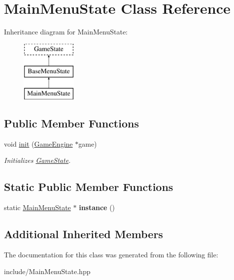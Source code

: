 \hypertarget{class_main_menu_state}{}\section{Main\+Menu\+State Class Reference}
\label{class_main_menu_state}
Inheritance diagram for Main\+Menu\+State\+:\begin{figure}[H]
\begin{center}
\leavevmode
\includegraphics[height=3.000000cm]{class_main_menu_state}
\end{center}
\end{figure}
\subsection*{Public Member Functions}
\begin{DoxyCompactItemize}
\item 
\mbox{\label{class_main_menu_state_a83efff7f63145d55d1937e76970d2a25}} 
void \mbox{\hyperlink{class_main_menu_state_a83efff7f63145d55d1937e76970d2a25}{init}} (\mbox{\hyperlink{class_game_engine}{Game\+Engine}} $\ast$game)
\begin{DoxyCompactList}\small\item\em Initializes \mbox{\hyperlink{class_game_state}{Game\+State}}. \end{DoxyCompactList}\end{DoxyCompactItemize}
\subsection*{Static Public Member Functions}
\begin{DoxyCompactItemize}
\item 
\mbox{\label{class_main_menu_state_aa74b0c80e78c1ef8f04da374a0907414}} 
static \mbox{\hyperlink{class_main_menu_state}{Main\+Menu\+State}} $\ast$ {\bfseries instance} ()
\end{DoxyCompactItemize}
\subsection*{Additional Inherited Members}


The documentation for this class was generated from the following file\+:\begin{DoxyCompactItemize}
\item 
include/Main\+Menu\+State.\+hpp\end{DoxyCompactItemize}
